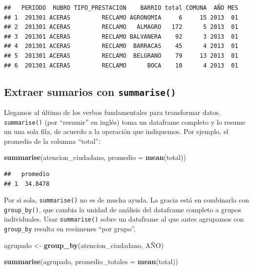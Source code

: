 \documentclass[spanish,]{book}
\newenvironment{Shaded}{\begin{snugshade}}{\end{snugshade}}
\newcommand{\DataTypeTok}[1]{\textcolor[rgb]{0.13,0.29,0.53}{#1}}
\newcommand{\KeywordTok}[1]{\textcolor[rgb]{0.13,0.29,0.53}{\textbf{#1}}}
\newcommand{\NormalTok}[1]{#1}
\newcommand{\StringTok}[1]{\textcolor[rgb]{0.31,0.60,0.02}{#1}}
\begin{document}
\begin{verbatim}
##   PERIODO  RUBRO TIPO_PRESTACION    BARRIO total COMUNA  AÑO MES
## 1  201301 ACERAS         RECLAMO AGRONOMIA     6     15 2013  01
## 2  201301 ACERAS         RECLAMO   ALMAGRO   172      5 2013  01
## 3  201301 ACERAS         RECLAMO BALVANERA    92      3 2013  01
## 4  201301 ACERAS         RECLAMO  BARRACAS    45      4 2013  01
## 5  201301 ACERAS         RECLAMO  BELGRANO    79     13 2013  01
## 6  201301 ACERAS         RECLAMO      BOCA    10      4 2013  01
\end{verbatim}

\hypertarget{extraer-sumarios-con-summarise}{%
\subsection{\texorpdfstring{Extraer sumarios con \texttt{summarise()}}{Extraer sumarios con summarise()}}\label{extraer-sumarios-con-summarise}}

Llegamos al último de los verbos fundamentales para transformar datos. \texttt{summarise()} (por ``resumir'' en inglés) toma un dataframe completo y lo resume un una sola fila, de acuerdo a la operación que indiquemos. Por ejemplo, el promedio de la columna ``total'':

\begin{Shaded}
\begin{Highlighting}[]
\KeywordTok{summarise}\NormalTok{(atencion_ciudadano, }\DataTypeTok{promedio =} \KeywordTok{mean}\NormalTok{(total))}
\end{Highlighting}
\end{Shaded}

\begin{verbatim}
##   promedio
## 1  34.8478
\end{verbatim}

Por si sola, \texttt{summarise()} no es de mucha ayuda. La gracia está en combinarla con \texttt{group\_by()}, que cambia la unidad de análisis del dataframe completo a grupos individuales. Usar \texttt{summarise()} sobre un dataframe al que antes agrupamos con \texttt{group\_by} resulta en resúmenes ``por grupo''.

\begin{Shaded}
\begin{Highlighting}[]
\NormalTok{agrupado <-}\StringTok{ }\KeywordTok{group_by}\NormalTok{(atencion_ciudadano, AÑO)}

\KeywordTok{summarise}\NormalTok{(agrupado, }\DataTypeTok{promedio_totales =} \KeywordTok{mean}\NormalTok{(total))}
\end{Highlighting}
\end{Shaded}
\end{document}
